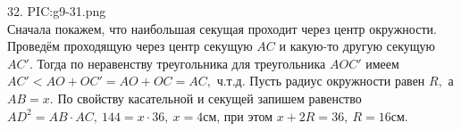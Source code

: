 32. {{PIC:g9-31.png}}\\
Сначала покажем, что наибольшая секущая проходит через центр окружности. Проведём проходящую через центр секущую $AC$ и какую-то другую секущую $AC'.$ Тогда по неравенству треугольника для треугольника $AOC'$ имеем $AC'<AO+OC'=AO+OC=AC,$ ч.т.д. Пусть радиус окружности равен $R,$ а $AB=x.$ По свойству касательной и секущей
запишем равенство $AD^2=AB\cdot AC,\ 144=x\cdot 36,\ x=4$см, при этом $x+2R=36,\ R=16$см.\\
